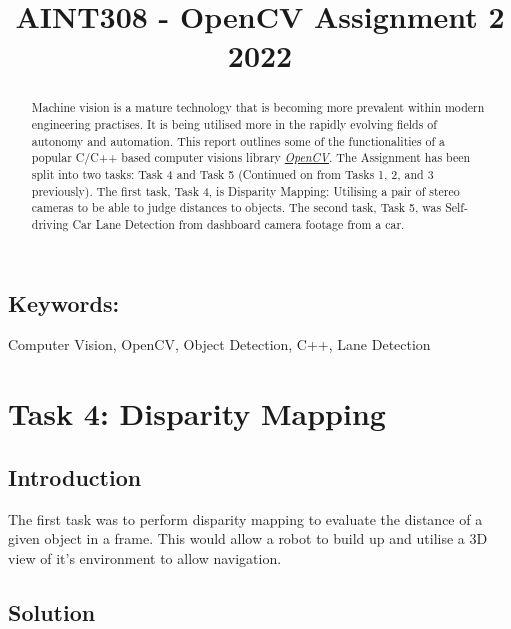 \documentclass[conference]{IEEEtran}
\begin{document}
\title{AINT308 - OpenCV Assignment 2 2022}

\author{
}

\maketitle

\begin{abstract}

Machine vision is a mature technology that is becoming more prevalent within modern engineering practises. It is being utilised more in the rapidly evolving fields of autonomy and automation. This report outlines some of the functionalities of a popular C/C++ based computer visions library \href{https://opencv.org}{\textit{OpenCV}}. The Assignment has been split into two tasks: Task 4 and Task 5 (Continued on from Tasks 1, 2, and 3 previously). The first task, Task 4, is Disparity Mapping: Utilising a pair of stereo cameras to be able to judge distances to objects. The second task, Task 5, was Self-driving Car Lane Detection from dashboard camera footage from a car.

\end{abstract}

\subsection*{Keywords:} 
Computer Vision, OpenCV, Object Detection, C++, Lane Detection

\section{Task 4: Disparity Mapping}	
\subsection{Introduction}

The first task was to perform disparity mapping to evaluate the distance of a given object in a frame. This would allow a robot to build up and utilise a 3D view of it's environment to allow navigation. 

\subsection{Solution}
\end{document}
